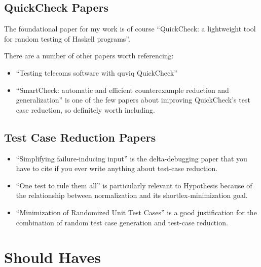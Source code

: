 \subsection{QuickCheck Papers}

The foundational paper for my work is of course ``QuickCheck: a lightweight tool for random testing of Haskell programs''\cite{DBLP:conf/icfp/ClaessenH00}.

There are a number of other papers worth referencing:

\begin{itemize}
\item ``Testing telecoms software with quviq QuickCheck''\cite{DBLP:conf/erlang/ArtsHJW06}
\item ``SmartCheck: automatic and efficient counterexample reduction and generalization''\cite{DBLP:conf/haskell/Pike14} is one of the few papers about improving QuickCheck's test case reduction,
so definitely worth including.
\end{itemize}

\subsection{Test Case Reduction Papers}

\begin{itemize}
\item ``Simplifying failure-inducing input''\cite{DBLP:conf/issta/HildebrandtZ00} is the delta-debugging paper that you have to cite if you ever write anything about test-case reduction.
\item ``One test to rule them all''\cite{DBLP:conf/issta/GroceHK17} is particularly relevant to Hypothesis because of the relationship between normalization and its shortlex-minimization goal.
\item ``Minimization of Randomized Unit Test Cases''\cite{DBLP:conf/issre/LeiA05} is a good justification for the combination of random test case generation and test-case reduction.
\end{itemize}

\section{Should Haves}

